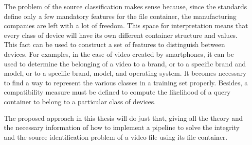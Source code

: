 The problem of the source classification makes sense because, since the standards define only a few mandatory features for the file container, the manufacturing companies are left with a lot of freedom. This space for interpretation means that every class of device will have its own different container structure and values. This fact can be used to construct a set of features to distinguish between devices. For examples, in the case of video created by smartphones, it can be used to determine the belonging of a video to a brand, or to a specific brand and model, or to a specific brand, model, and operating system.
It becomes necessary to find a way to represent the various classes in a training set properly. Besides, a compatibility measure must be defined to compute the likelihood of a query container to belong to a particular class of devices.

The proposed approach in this thesis will do just that, giving all the theory and the necessary information of how to implement a pipeline to solve the integrity and the source identification problem of a video file using its file container.